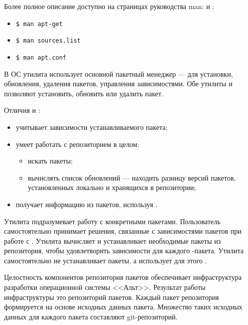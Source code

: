Более полное описание доступно на страницах руководства man:
 и :
\begin{itemize}
	\item\begin{verbatim}$ man apt-get\end{verbatim}
	\item\begin{verbatim}$ man sources.list\end{verbatim}
	\item\begin{verbatim}$ man apt.conf\end{verbatim}
\end{itemize}

В ОС  утилита  использует основной пакетный менеджер  ---
 для установки, обновления, удаления пакетов, управления зависимостями. Обе
утилиты  и  позволяют установить, обновить или удалить пакет.

Отличия  и :
\begin{itemize}
	\item {} учитывает зависимости устанавливаемого пакета;
	\item {} умеет работать с репозиторием в целом:
	\begin{itemize}
		\item искать пакеты;
		\item вычислять список обновлений --- находить разницу версий пакетов,
		установленных локально и хранящихся в репозитории;
	\end{itemize}
	\item {} получает информацию из пакетов, используя .
\end{itemize}

Утилита  подразумевает работу с конкретными пакетами. Пользователь самостоятельно
принимает решения, связанные с зависимостями пакетов  при работе с . Утилита 
вычисляет и устанавливает необходимые пакеты из репозитория, чтобы удовлетворить зависимости для
каждого -пакета. Утилита  самостоятельно не устанавливает пакеты, а использует для этого .


Целостность компонентов репозитория пакетов обеспечивает инфраструктура разработки операционной системы <<Альт>>.
Результат работы инфраструктуры это репозиторий пакетов. Каждый пакет репозитория формируется на
основе исходных данных пакета. Множество таких исходных данных для каждого пакета составляют git-репозиторий.

